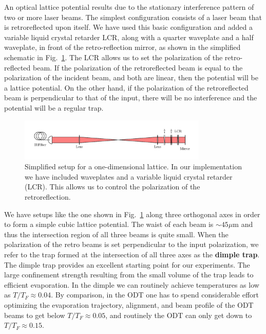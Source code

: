 An optical lattice potential results due to the stationary interference pattern
of two or more laser beams.   The simplest configuration consists of a laser
beam that is retroreflected upon itself.  We have used this basic
configuration and added a variable liquid crystal retarder LCR, along with a
quarter waveplate and a half waveplate,  in front of the retro-reflection
mirror, as shown in the simplified schematic in Fig.~\ref{fig:simple-latt}.  The
LCR allows us to set the polarization of the retro-reflected beam.  If the
polarization of the retroreflected beam is equal to the polarization of the
incident beam, and both are linear,  then the potential will be a lattice
potential.  On the other hand, if the polarization of the retroreflected beam is
perpendicular to that of the input, there will be no interference and the
potential will be a regular trap.
\begin{figure}
\centering
\includegraphics[width=0.8\textwidth]{../ernie-figures/lattice/simple-assembly/latticesassembly.pdf}
\caption[Simplified lattice axis]{\small Simplified setup for a one-dimensional
lattice.   In our implementation we have included waveplates and a variable
liquid crystal retarder (LCR). This allows us to control the polarization of
the retroreflection.  }
\label{fig:simple-latt} 
\end{figure}

We have setups like the one shown in Fig.~\ref{fig:simple-latt} along three
orthogonal axes in order to form a simple cubic lattice potential.   The waist
of each beam is $\sim45\mu$m and thus the intersection region of all three
beams is quite small.  When the polarization of the retro beams is set
perpendicular to the input polarization, we refer to the trap formed at the
intersection of all three axes as the \textbf{dimple trap}.  The dimple trap
provides an excellent starting point for our experiments.   The large
confinement strength resulting from the small volume of the trap leads to efficient
evaporation.  In the dimple we can routinely achieve temperatures as low as
$T/T_{F}\approx 0.04$.  By comparison, in the ODT  one has to spend
considerable effort optimizing the evaporation trajectory, alignment, and beam
profile of the ODT beams to get below $T/T_{F}\approx0.05$, and routinely the
ODT can only get down to $T/T_{F}\approx 0.15$. 


